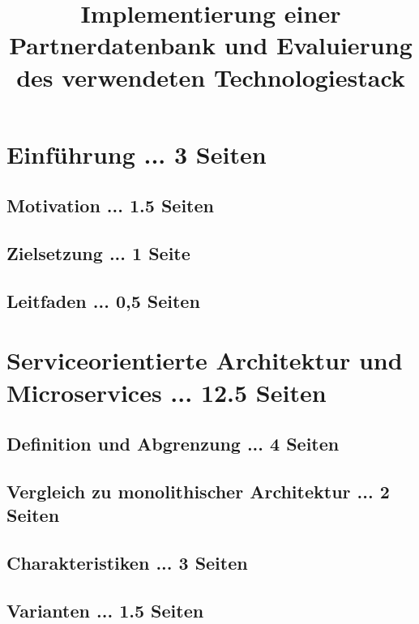 \documentclass[master,german]{hgbthesis}
\title{Implementierung einer Partnerdatenbank und Evaluierung des verwendeten Technologiestack} %
\begin{document}

\frontmatter							%


\tableofcontents

%

\mainmatter          			%

\chapter{Einführung ... 3 Seiten}
\section{Motivation ... 1.5 Seiten}
\section{Zielsetzung ... 1 Seite}
\section{Leitfaden ... 0,5 Seiten}

\chapter{Serviceorientierte Architektur und Microservices ... 12.5 Seiten}
\section{Definition und Abgrenzung ... 4 Seiten}
\section{Vergleich zu monolithischer Architektur ... 2 Seiten}
\section{Charakteristiken ... 3 Seiten}
\section{Varianten ... 1.5 Seiten}
\end{document}
